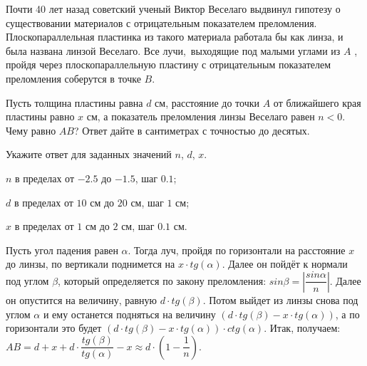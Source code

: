 
Почти 40 лет назад советский ученый
Виктор Веселаго выдвинул гипотезу о существовании материалов с отрицательным
показателем преломления. Плоскопараллельная пластинка из такого материала
работала бы как линза, и была названа линзой Веселаго. Все
лучи, выходящие под малыми углами из $A$ , пройдя через плоскопараллельную пластину с 
отрицательным показателем преломления соберутся в точке $B$.


Пусть толщина пластины равна $d$ см, расстояние до точки $A$ от ближайшего края пластины
равно $x$ см, а показатель преломления линзы Веселаго равен $n < 0$. Чему равно $AB$? Ответ
дайте в сантиметрах с точностью до десятых.

Укажите ответ для заданных значений $n$, $d$, $x$.

\paramSection

$n$ в пределах от $-2.5$ до $-1.5$, шаг $0.1$;     

$d$ в пределах от $10$ см до $20$ см, шаг $1$ см; 

$x$ в пределах от $1$ см до $2$ см, шаг $0.1$ см.

\solutionSection

Пусть угол падения равен $\alpha$. Тогда луч, пройдя по горизонтали на расстояние $x$ до линзы, по вертикали поднимется на 
$x \cdot tg(\alpha)$. Далее он пойдёт к нормали под углом $\beta$, который определяется по закону преломления: 
$sin\beta=\left|\dfrac{sin\alpha}{n}\right|$. Далее он опустится на величину, равную $d \cdot tg(\beta)$. 
Потом выйдет из линзы снова под углом $\alpha$ и ему останется подняться на величину $(d \cdot  tg(\beta) - x \cdot tg(\alpha) )$, 
а по горизонтали это будет $(d \cdot  tg(\beta) - x \cdot tg(\alpha )) \cdot ctg(\alpha )$. 
Итак, получаем:  $AB=d+x+d \cdot \dfrac{tg(\beta)}{tg(\alpha )}-x \approx d \cdot (1 - \dfrac{1}{n})$.


